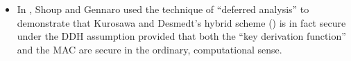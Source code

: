 \begin{itemize}
\item In \cite{gennaro:noteonkd}, Shoup and Gennaro 
used the technique of ``deferred analysis'' to demonstrate that Kurosawa and
Desmedt's hybrid scheme (\cite{kurosawa:newparadigm}) is in fact secure under
the DDH assumption provided that both the ``key derivation function'' and the
MAC are secure in the ordinary, computational sense.




\end{itemize}

